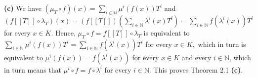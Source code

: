 \documentclass[12pt,final,notitlepage,onecolumn,german]{article}%
\begin{document}
\textbf{(c)} We have $\left(  \mu_{T}\circ f\right)  \left(  x\right)
=\sum\limits_{i\in\mathbb{N}}\mu^{i}\left(  f\left(  x\right)  \right)  T^{i}$
and $\left(  f\left[  \left[  T\right]  \right]  \circ\lambda_{T}\right)
\left(  x\right)  =\left(  f\left[  \left[  T\right]  \right]  \right)
\left(  \sum\limits_{i\in\mathbb{N}}\lambda^{i}\left(  x\right)  T^{i}\right)
=\sum\limits_{i\in\mathbb{N}}f\left(  \lambda^{i}\left(  x\right)  \right)
T^{i}$ for every $x\in K$. Hence, $\mu_{T}\circ f=f\left[  \left[  T\right]
\right]  \circ\lambda_{T}$ is equivalent to $\sum\limits_{i\in\mathbb{N}}%
\mu^{i}\left(  f\left(  x\right)  \right)  T^{i}=\sum\limits_{i\in\mathbb{N}%
}f\left(  \lambda^{i}\left(  x\right)  \right)  T^{i}$ for every $x\in K,$
which in turn is equivalent to $\mu^{i}\left(  f\left(  x\right)  \right)
=f\left(  \lambda^{i}\left(  x\right)  \right)  $ for every $x\in K$ and every
$i\in\mathbb{N}$, which in turn means that $\mu^{i}\circ f=f\circ\lambda^{i}$
for every $i\in\mathbb{N}$. This proves Theorem 2.1 \textbf{(c)}.
\end{document}
